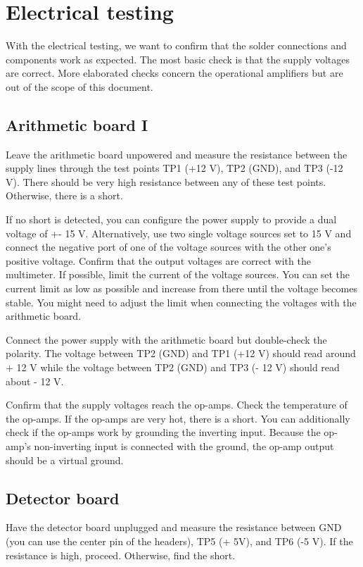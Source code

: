 \section{Electrical testing}

With the electrical testing, we want to confirm that the solder connections and components work as expected.
The most basic check is that the supply voltages are correct.
More elaborated checks concern the operational amplifiers but are out of the scope of this document.

\subsection{Arithmetic board I}

Leave the arithmetic board unpowered and measure the resistance between the supply lines through the test points TP1 (+12 V), TP2 (GND), and TP3 (-12 V).
There should be very high resistance between any of these test points.
Otherwise, there is a short.

If no short is detected, you can configure the power supply to provide a dual voltage of +- 15 V.
Alternatively, use two single voltage sources set to 15 V and connect the negative port of one of the voltage sources with the other one's positive voltage.
Confirm that the output voltages are correct with the multimeter. If possible, limit the current of the voltage sources.
You can set the current limit as low as possible and increase from there until the voltage becomes stable.
You might need to adjust the limit when connecting the voltages with the arithmetic board.

Connect the power supply with the arithmetic board but double-check the polarity.
The voltage between TP2 (GND) and TP1 (+12 V) should read around + 12 V while the voltage between TP2 (GND) and TP3 (- 12 V) should read about - 12 V.

Confirm that the supply voltages reach the op-amps.
Check the temperature of the op-amps.
If the op-amps are very hot, there is a short.
You can additionally check if the op-amps work by grounding the inverting input.
Because the op-amp's non-inverting input is connected with the ground, the op-amp output should be a virtual ground.

\subsection{Detector board}

Have the detector board unplugged and measure the resistance between GND (you can use the center pin of the headers), TP5 (+ 5V), and TP6 (-5 V). If the resistance is high, proceed. Otherwise, find the short.

